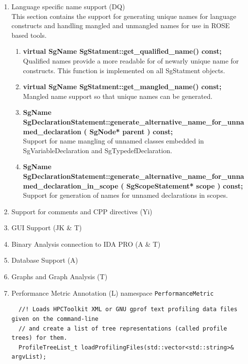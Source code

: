 \begin{enumerate}
   \item Language specific name support (DQ) \\
         This section contains the support for generating unique names for language
         constructs and handling mangled and unmangled names for use in ROSE based tools.
   \begin{enumerate}
      \item {\bf virtual SgName SgStatment::get\_qualified\_name() const;} \\
       Qualified names provide a more readable for of newarly unique name for constructs.
       This function is implemented on all SgStatment objects.

      \item {\bf virtual SgName SgStatment::get\_mangled\_name() const;} \\
       Mangled name support so that unique names can be generated.

      \item {\bf SgName SgDeclarationStatement::generate\_alternative\_name\_for\_unnamed\_declaration ( SgNode* parent ) const;} \\
      Support for name mangling of unnamed classes embedded in SgVariableDeclaration and SgTypedefDeclaration.

      \item {\bf SgName SgDeclarationStatement::generate\_alternative\_name\_for\_unnamed\_declaration\_in\_scope ( SgScopeStatement* scope ) const;} \\
      Support for generation of names for unnamed declarations in scopes.

   \end{enumerate}

   \item Support for comments and CPP directives (Yi)

   \item GUI Support (JK \& T)

   \item Binary Analysis connection to IDA PRO (A \& T)

   \item Database Support (A)

   \item Graphs and Graph Analysis (T)

   \item Performance Metric Annotation (L)
   namespace \lstinline{PerformanceMetric} 
\begin{lstlisting}
  //! Loads HPCToolkit XML or GNU gprof text profiling data files given on the command-line
  // and create a list of tree representations (called profile trees) for them.
  ProfileTreeList_t loadProfilingFiles(std::vector<std::string>& argvList);


\end{lstlisting}
\end{enumerate}
